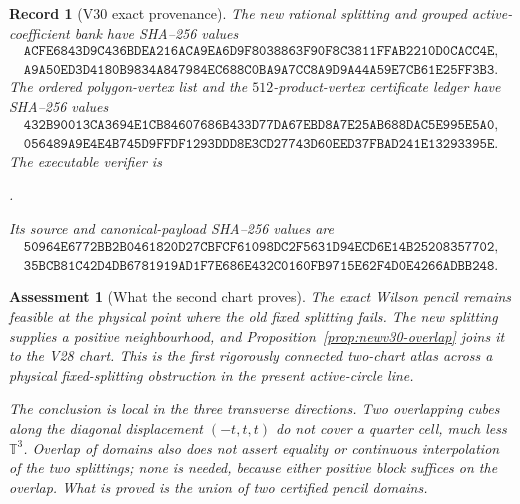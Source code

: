 \documentclass[11pt,oneside]{article}
\newtheorem{assessment}[theorem]{Assessment}
\newtheorem{record}[theorem]{Record}
\theoremstyle{definition}
\theoremstyle{remark}
\begin{document}
\begin{record}[V30 exact provenance]
\label{rec:newv30-provenance}
The new rational splitting and grouped active-coefficient bank have
SHA--256 values
\[
\begin{gathered}
\texttt{ACFE6843D9C436BDEA216ACA9EA6D9F8038863F90F8C3811FFAB2210D0CACC4E},\\
\texttt{A9A50ED3D4180B9834A847984EC688C0BA9A7CC8A9D9A44A59E7CB61E25FF3B3}.
\end{gathered}                                          \tag{30.19}
\]
The ordered polygon-vertex list and the \(512\)-product-vertex
certificate ledger have SHA--256 values
\[
\begin{gathered}
\texttt{432B90013CA3694E1CB84607686B433D77DA67EBD8A7E25AB688DAC5E995E5A0},\\
\texttt{056489A9E4E4B745D9FFDF1293DDD8E3CD27743D60EED37FBAD241E13293395E}.
\end{gathered}                                          \tag{30.20}
\]
The executable verifier is
\begin{center}
\footnotesize
{}.
\end{center}
Its source and canonical-payload SHA--256 values are
\[
\begin{gathered}
\texttt{50964E6772BB2B0461820D27CBFCF61098DC2F5631D94ECD6E14B25208357702},\\
\texttt{35BCB81C42D4DB6781919AD1F7E686E432C0160FB9715E62F4D0E4266ADBB248}.
\end{gathered}                                          \tag{30.21}
\]
\end{record}

\begin{assessment}[What the second chart proves]
\label{ass:newv30}
The exact Wilson pencil remains feasible at the physical point where
the old fixed splitting fails.  The new splitting supplies a
positive neighbourhood, and Proposition~\ref{prop:newv30-overlap}
joins it to the V28 chart.  This is the first rigorously connected
two-chart atlas across a physical fixed-splitting obstruction in
the present active-circle line.

The conclusion is local in the three transverse directions.  Two
overlapping cubes along the diagonal displacement
\((-t,t,t)\) do not cover a quarter cell, much less
\(\mathbb T^3\).  Overlap of domains also does not assert equality or
continuous interpolation of the two splittings; none is needed,
because either positive block suffices on the overlap.  What is
proved is the union of two certified pencil domains.
\end{assessment}
\end{document}
